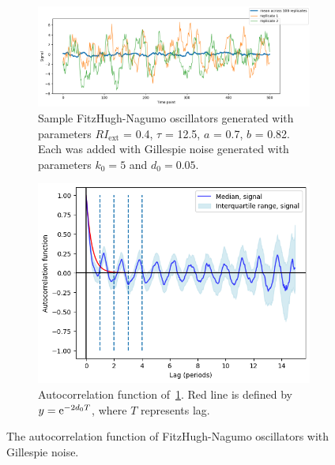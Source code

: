 \begin{figure}
  \centering
  \begin{subfigure}[t]{0.7\textwidth}
  \centering
    \includegraphics[width=\linewidth]{fhn_meanplot}
    \caption{
      Sample FitzHugh-Nagumo oscillators generated with parameters $RI_{\mathrm{ext}}$ = 0.4, $\tau$ = 12.5, $a$ = 0.7, $b$ = 0.82.
      Each was added with Gillespie noise generated with parameters $k_{0} = 5$ and $d_{0} = 0.05$.
    }
    \label{fig:acf-fhn-gillnoise-ts}
  \end{subfigure}

  \begin{subfigure}[t]{0.7\textwidth}
  \centering
    \includegraphics[width=\linewidth]{fhn_acf}
    \caption{
      Autocorrelation function of~\ref{fig:acf-fhn-gillnoise-ts}.
      Red line is defined by $y = \mathrm{e}^{-2d_{0}T}$, where $T$ represents lag.
    }
    \label{fig:acf-fhn-gillnoise-acf}
  \end{subfigure}

  \caption{
    The autocorrelation function of FitzHugh-Nagumo oscillators with Gillespie noise.
  }
  \label{fig:acf-fhn}
\end{figure}

